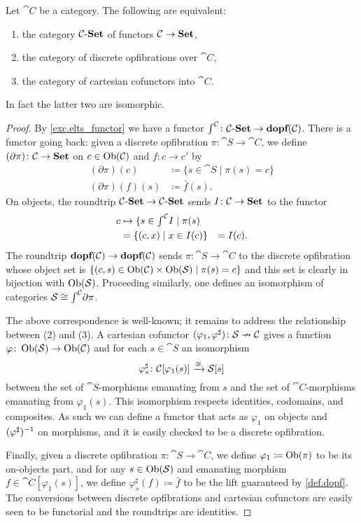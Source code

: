 \documentclass[DynamicalBook]{subfiles}
\begin{document}
\begin{proposition}\label{prop.tfae_dopf}
Let $\cat{C}$ be a category. The following are equivalent:
\begin{enumerate}
	\item the category $\mathcal{C}\textnormal{-}\textbf{Set}$ of functors $\mathcal{C}\to\textbf{Set}$,
	\item the category of discrete opfibrations over $\cat{C}$,
	\item the category of cartesian cofunctors into $\cat{C}$.
\end{enumerate}
In fact the latter two are isomorphic.
\end{proposition}
\begin{proof}
By \cref{exc.elts_functor} we have a functor $\textstyle{\int}^{\mathcal{C}}\colon\mathcal{C}\textnormal{-}\textbf{Set}\to\textbf{dopf}(\mathcal{C})$. There is a functor going back: given a discrete opfibration $\pi\colon\cat{S}\to\cat{C}$, we define $(\partial\pi)\colon\mathcal{C}\to\textbf{Set}$ on $c\in\operatorname{Ob}(\mathcal{C})$ and $f\colon c\to c'$ by 
\begin{align*}
	(\partial\pi)(c)&\coloneqq\{s\in\cat{S}\mid\pi(s)=c\}\\
	(\partial\pi)(f)(s)&\coloneqq\bar{f}(s).
\end{align*}
On objects, the roundtrip $\mathcal{C}\textnormal{-}\textbf{Set}\to\mathcal{C}\textnormal{-}\textbf{Set}$ sends $I\colon\mathcal{C}\to\textbf{Set}$ to the functor
\begin{align*}
	c&
	\mapsto\{s\in\textstyle{\int}^{\mathcal{C}}I\mid \pi(s)\\&
	=\{(c,x)\mid x\in I(c)\}&=I(c).
\end{align*}
The roundtrip $\textbf{dopf}(\mathcal{C})\to\textbf{dopf}(\mathcal{C})$ sends $\pi\colon\cat{S}\to\cat{C}$ to the discrete opfibration whose object set is $\{(c,s)\in\operatorname{Ob}(\mathcal{C})\times\operatorname{Ob}(\mathcal{S})\mid\pi(s)=c\}$ and this set is clearly in bijection with $\operatorname{Ob}(\mathcal{S})$. Proceeding similarly, one defines an isomorphism of categories $\mathcal{S}\cong\textstyle{\int}^{\mathcal{C}}\partial\pi$.

The above correspondence is well-known; it remains to address the relationship between (2) and (3). A cartesian cofunctor $(\varphi_1,\varphi^\sharp)\colon\mathcal{S}\nrightarrow\mathcal{C}$ gives a function $\varphi\colon\operatorname{Ob}(\mathcal{S})\to\operatorname{Ob}(\mathcal{C})$ and for each $s\in\cat{S}$ an isomorphism
\[
  \varphi_s^\sharp\colon\mathcal{C}[\varphi_1(s)]\xrightarrow{\cong}\mathcal{S}[s]
\]
between the set of $\cat{S}$-morphisms emanating from $s$ and the set of $\cat{C}$-morphisms emanating from $\varphi_1(s)$. This isomorphism respects identities, codomains, and composites. As such we can define a functor that acts as $\varphi_1$ on objects and $(\varphi^\sharp)^{-1}$ on morphisms, and it is easily checked to be a discrete opfibration.

Finally, given a discrete opfibration $\pi\colon\cat{S}\to\cat{C}$, we define $\varphi_1\coloneqq\operatorname{Ob}(\pi)$ to be its on-objects part, and for any $s\in\operatorname{Ob}(\mathcal{S})$ and emanating morphism $f\in\cat{C}[\varphi_1(s)]$, we define $\varphi^\sharp_s(f)\coloneqq\bar{f}$ to be the lift guaranteed by \cref{def.dopf}. The conversions between discrete opfibrations and cartesian cofunctors are easily seen to be functorial and the roundtrips are identities.
\end{proof}
\end{document}
